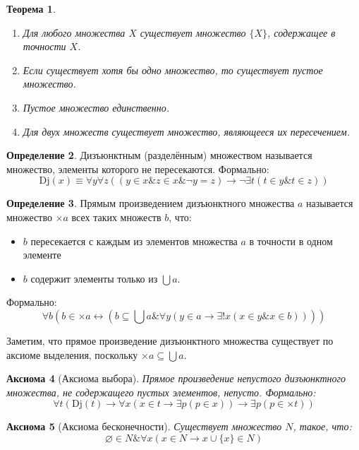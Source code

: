 \documentclass[a4paper,11pt]{article}
\newtheorem{thm}{Теорема}[section]
\newtheorem{axm}[thm]{Аксиома}
\theoremstyle{definition}
\newtheorem{dfn}[thm]{Определение}
\newcommand{\amp}{\mathbin{\&}}
\begin{document}
\begin{thm}
\begin{enumerate}
\item Для любого множества $X$ существует множество $\{X\}$, содержащее в
  точности $X$.
\item Если существует хотя бы одно множество, то существует пустое множество.
\item Пустое множество единственно.
\item Для двух множеств существует множество, являющееся их пересечением.
\end{enumerate}
\end{thm}

\begin{dfn}
Дизъюнктным (разделённым) множеством называется множество, элементы которого не
пересекаются. Формально:
\[ \mathrm{Dj}(x) \equiv \forall y\forall z((y \in x \amp z \in x \amp \neg y = z) \to \neg\exists t(t \in y \amp t \in z)) \]
\end{dfn}

\begin{dfn}
Прямым произведением дизъюнктного множества $a$ называется множество $\times a$
всех таких множеств $b$, что:
\begin{itemize}
\item $b$ пересекается с каждым из элементов множества $a$ в точности в одном
  элементе
\item $b$ содержит элементы только из $\bigcup a$.
\end{itemize}
Формально:
\[ \forall b(b \in \times a \leftrightarrow (b \subseteq \bigcup a \amp \forall y(y \in a \to \exists!x(x \in y \amp x \in b)))) \]
\end{dfn}

Заметим, что прямое произведение дизъюнктного множества существует по аксиоме
выделения, поскольку $\times a \subseteq \bigcup a$.

\begin{axm}[Аксиома выбора]
Прямое произведение непустого дизъюнктного множества, не содержащего пустых
элементов, непусто. Формально:
\[ \forall t(\mathrm{Dj}(t) \to \forall x(x \in t \to \exists p(p \in x)) \to \exists p(p \in \times t)) \]
\end{axm}

\begin{axm}[Аксиома бесконечности]
Существует множество $N$, такое, что:
\[ \varnothing \in N \amp \forall x(x \in N \to x \cup \{x\} \in N) \]
\end{axm}
\end{document}
